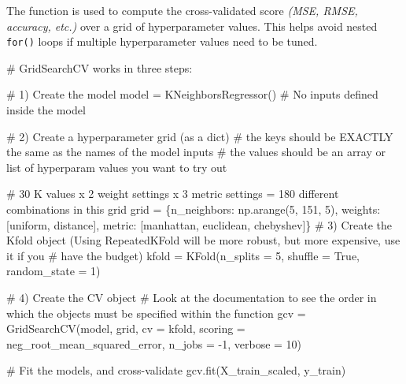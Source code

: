 \documentclass[
  letterpaper,
  DIV=11,
  numbers=noendperiod]{scrreprt}
\newenvironment{Shaded}{\begin{snugshade}}{\end{snugshade}}
\newcommand{\CommentTok}[1]{\textcolor[rgb]{0.37,0.37,0.37}{#1}}
\newcommand{\DecValTok}[1]{\textcolor[rgb]{0.68,0.00,0.00}{#1}}
\newcommand{\NormalTok}[1]{\textcolor[rgb]{0.00,0.23,0.31}{#1}}
\newcommand{\OperatorTok}[1]{\textcolor[rgb]{0.37,0.37,0.37}{#1}}
\newcommand{\StringTok}[1]{\textcolor[rgb]{0.13,0.47,0.30}{#1}}
\newcommand{\VariableTok}[1]{\textcolor[rgb]{0.07,0.07,0.07}{#1}}
\begin{document}
The function is used to compute the cross-validated score \emph{(MSE,
RMSE, accuracy, etc.)} over a grid of hyperparameter values. This helps
avoid nested \texttt{for()} loops if multiple hyperparameter values need
to be tuned.

\begin{Shaded}
\begin{Highlighting}[]
\CommentTok{\# GridSearchCV works in three steps:}

\CommentTok{\# 1) Create the model}
\NormalTok{model }\OperatorTok{=}\NormalTok{ KNeighborsRegressor() }\CommentTok{\# No inputs defined inside the model}

\CommentTok{\# 2) Create a hyperparameter grid (as a dict)}
    \CommentTok{\# the keys should be EXACTLY the same as the names of the model inputs}
    \CommentTok{\# the values should be an array or list of hyperparam values you want to try out}
    
\CommentTok{\# 30 K values x 2 weight settings x 3 metric settings = 180 different combinations in this grid}
\NormalTok{grid }\OperatorTok{=}\NormalTok{ \{}\StringTok{\textquotesingle{}n\_neighbors\textquotesingle{}}\NormalTok{: np.arange(}\DecValTok{5}\NormalTok{, }\DecValTok{151}\NormalTok{, }\DecValTok{5}\NormalTok{), }\StringTok{\textquotesingle{}weights\textquotesingle{}}\NormalTok{:[}\StringTok{\textquotesingle{}uniform\textquotesingle{}}\NormalTok{, }\StringTok{\textquotesingle{}distance\textquotesingle{}}\NormalTok{], }
        \StringTok{\textquotesingle{}metric\textquotesingle{}}\NormalTok{: [}\StringTok{\textquotesingle{}manhattan\textquotesingle{}}\NormalTok{, }\StringTok{\textquotesingle{}euclidean\textquotesingle{}}\NormalTok{, }\StringTok{\textquotesingle{}chebyshev\textquotesingle{}}\NormalTok{]\}}
\CommentTok{\# 3) Create the Kfold object (Using RepeatedKFold will be more robust, but more expensive, use it if you }
\CommentTok{\# have the budget)}
\NormalTok{kfold }\OperatorTok{=}\NormalTok{ KFold(n\_splits }\OperatorTok{=} \DecValTok{5}\NormalTok{, shuffle }\OperatorTok{=} \VariableTok{True}\NormalTok{, random\_state }\OperatorTok{=} \DecValTok{1}\NormalTok{)}

\CommentTok{\# 4) Create the CV object}
\CommentTok{\# Look at the documentation to see the order in which the objects must be specified within the function}
\NormalTok{gcv }\OperatorTok{=}\NormalTok{ GridSearchCV(model, grid, cv }\OperatorTok{=}\NormalTok{ kfold, scoring }\OperatorTok{=} \StringTok{\textquotesingle{}neg\_root\_mean\_squared\_error\textquotesingle{}}\NormalTok{, n\_jobs }\OperatorTok{=} \OperatorTok{{-}}\DecValTok{1}\NormalTok{, verbose }\OperatorTok{=} \DecValTok{10}\NormalTok{)}

\CommentTok{\# Fit the models, and cross{-}validate}
\NormalTok{gcv.fit(X\_train\_scaled, y\_train)}
\end{Highlighting}
\end{Shaded}
\end{document}
